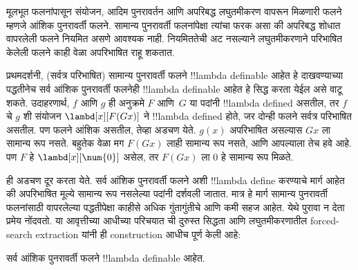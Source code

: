 \documentclass[../../../include/open-logic-section]{subfiles}
\begin{document}

मूलभूत फलनांपासून संयोजन, आदिम पुनरावर्तन आणि
अपरिबद्ध लघुतमीकरण वापरून मिळणारी फलने म्हणजे
आंशिक पुनरावर्ती फलने. सामान्य पुनरावर्ती फलनांपेक्षा
त्यांचा फरक असा की अपरिबद्ध शोधात वापरलेली फलने
नियमित असणे आवश्यक नाही. नियमिततेची अट नसल्याने
लघुतमीकरणाने परिभाषित केलेली फलने काही वेळा
अपरिभाषित राहू शकतात.

प्रथमदर्शनी, (सर्वत्र परिभाषित) सामान्य पुनरावर्ती
फलने !!{lambda definable} आहेत हे दाखवण्याच्या
पद्धतीनेच सर्व आंशिक पुनरावर्ती फलनेही
!!{lambda definable} आहेत हे सिद्ध करता येईल असे
वाटू शकते. उदाहरणार्थ, $f$ आणि $g$ ही अनुक्रमे
$F$ आणि~$G$ या पदांनी !!{lambda define}d
असतील, तर $f$ चे $g$ शी संयोजन
$\lambd[x][F (G x)]$ ने !!{lambda define}d होते,
जर दोन्ही फलने सर्वत्र परिभाषित असतील.
पण फलने आंशिक असतील, तेव्हा अडचण येते.
$g(x)$ अपरिभाषित असल्यास $G x$ ला सामान्य रूप
नसते. बहुतेक वेळा मग $F (G x)$ लाही सामान्य रूप
नसते, आणि आपल्याला तेच हवे आहे. पण
$F$ हे $\lambd[x][\num{0}]$ असेल, तर
$F (G x)$ ला $\num{0}$ हे सामान्य रूप मिळते.

ही अडचण दूर करता येते. सर्व आंशिक पुनरावर्ती
फलने अशी !!{lambda define} करण्याचे मार्ग आहेत
की अपरिभाषित मूल्ये सामान्य रूप नसलेल्या पदांनी
दर्शवली जातात. मात्र हे मार्ग सामान्य पुनरावर्ती
फलनांसाठी वापरलेल्या पद्धतीपेक्षा काहीसे अधिक
गुंतागुंतीचे आणि कमी सहज आहेत. येथे पुरावा न देता
प्रमेय नोंदवतो. या आवृत्तीच्या आधीच्या परिचयात
 ची दुरुस्त
सिद्धता आणि लघुतमीकरणातील forced-search extraction
यांनी ही construction आधीच पूर्ण केली आहे:

\begin{thm}
  सर्व आंशिक पुनरावर्ती फलने !!{lambda definable} आहेत.
\end{thm}
\end{document}
